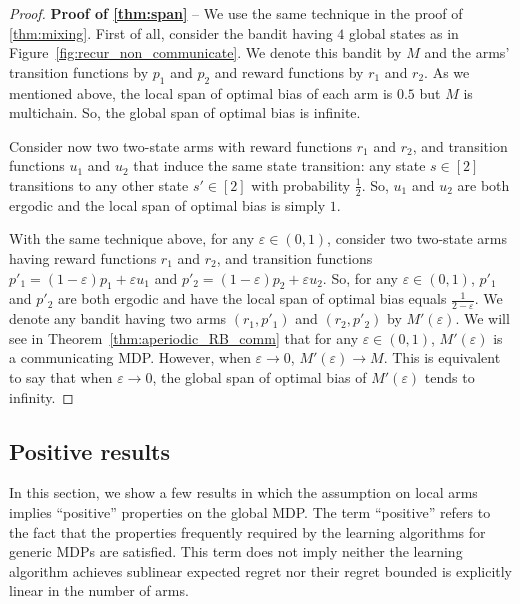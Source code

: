 \begin{proof}
    \textbf{Proof of \ref{thm:span}} -- We use the same technique in the proof of \ref{thm:mixing}.
    First of all, consider the bandit having $4$ global states as in Figure~\ref{fig:recur_non_communicate}.
    We denote this bandit by $M$ and the arms' transition functions by $p_1$ and $p_2$ and reward functions by $r_1$ and $r_2$.
    As we mentioned above, the local span of optimal bias of each arm is $0.5$ but $M$ is multichain.
    So, the global span of optimal bias is infinite.

    Consider now two two-state arms with reward functions $r_1$ and $r_2$, and transition functions $u_1$ and $u_2$ that induce the same state transition: any state $s\in[2]$ transitions to any other state $s'\in[2]$ with probability $\frac12$.
    So, $u_1$ and $u_2$ are both ergodic and the local span of optimal bias is simply $1$.

    With the same technique above, for any $\varepsilon\in(0,1)$, consider two two-state arms having reward functions $r_1$ and $r_2$, and transition functions $p'_1=(1-\varepsilon)p_1+\varepsilon u_1$ and $p'_2=(1-\varepsilon)p_2+\varepsilon u_2$.
    So, for any $\varepsilon\in(0,1)$, $p'_1$ and $p'_2$ are both ergodic and have the local span of optimal bias equals $\displaystyle\frac{1}{2-\varepsilon}$.
    We denote any bandit having two arms $(r_1,p'_1)$ and $(r_2,p'_2)$ by $M'(\varepsilon)$.
    We will see in Theorem~\ref{thm:aperiodic_RB_comm} that for any $\varepsilon\in(0,1)$, $M'(\varepsilon)$ is a communicating MDP.
    However, when $\varepsilon\to0$, $M'(\varepsilon)\to M$.
    This is equivalent to say that when $\varepsilon\to0$, the global span of optimal bias of $M'(\varepsilon)$ tends to infinity.
\end{proof}

\subsection{Positive results}

In this section, we show a few results in which the assumption on local arms implies ``positive'' properties on the global MDP.
The term ``positive'' refers to the fact that the properties frequently required by the learning algorithms for generic MDPs are satisfied.
This term does not imply neither the learning algorithm achieves sublinear expected regret nor their regret bounded is explicitly linear in the number of arms.

